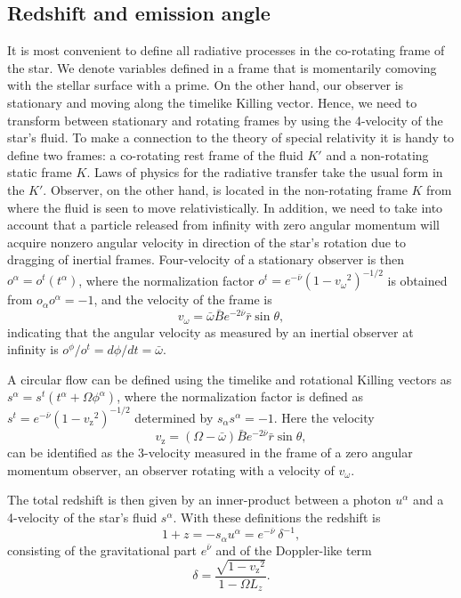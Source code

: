 \documentclass{aa}
\newcommand{\be}{\begin{equation}}
\newcommand{\ee}{\end{equation}}
\newcommand{\rb}{\ensuremath{\bar{r}}}
\newcommand{\wb}{\ensuremath{\bar{\omega}}}
\newcommand{\nub}{\ensuremath{\bar{\nu}}}
\newcommand{\Bb}{\ensuremath{\bar{B}}}
\newcommand{\vw}{\ensuremath{v_{\omega}}}
\newcommand{\vz}{\ensuremath{v_{\mathrm{z}}}}
\begin{document}
\subsection{Redshift and emission angle}\label{sect:redshift_angle}
It is most convenient to define all radiative processes in the co-rotating frame of the star.
We denote variables defined in a frame that is momentarily comoving with the stellar surface with a prime.  
On the other hand, our observer is stationary and moving along the timelike Killing vector.  
Hence, we need to transform between stationary and rotating frames by using the 4-velocity of the star's fluid.  
To make a connection to the theory of special relativity it is handy to define two frames: 
a co-rotating rest frame of the fluid $K'$ and a non-rotating static frame $K$.
Laws of physics for the radiative transfer take the usual form in the $K'$.
Observer, on the other hand, is located in the non-rotating frame $K$ from where the fluid is seen to move relativistically.
In addition, we need to take into account that a particle released from infinity with zero angular momentum will acquire nonzero angular velocity in direction of the star's rotation due to dragging of inertial frames.
Four-velocity of a stationary observer is then $o^{\alpha} = o^t(t^{\alpha})$, where the normalization factor $o^t = e^{-\nub}(1-\vw^2)^{-1/2}$ is obtained from $o_{\alpha}o^{\alpha} = -1$, and the velocity of the frame is 
\be
\vw = \wb \Bb e^{-2\nub} \rb \sin\theta,
\ee
indicating that the angular velocity as measured by an inertial observer at infinity is $o^{\phi} / o^{t} = d\phi/dt = \wb$.

A circular flow can be defined using the timelike and rotational Killing vectors as $s^{\alpha} = s^t (t^{\alpha} + \Omega \phi^{\alpha})$, where the normalization factor is defined as $s^t = e^{-\nub} (1 - \vz^2)^{-1/2}$ determined by $s_{\alpha}s^{\alpha} = -1$.
Here the velocity 
\be
\vz = (\Omega - \wb) \Bb e^{-2\nub} \rb \sin\theta,
\ee
can be identified as the 3-velocity measured in the frame of a zero angular momentum observer, an observer rotating with a velocity of $\vw$.

The total redshift is then given by an inner-product between a photon $u^{\alpha}$ and a 4-velocity of the star's fluid $s^{\alpha}$.
With these definitions the redshift is
\be\label{eq:redshift}
1 + z = -s_{\alpha} u^{\alpha} = e^{-\nub} ~\delta^{-1},
\ee
consisting of the gravitational part $e^{\nub}$ and of the Doppler-like term
\be
\delta = \frac{\sqrt{1-\vz^2}}{1 - \Omega L_z}.
\ee
\end{document}
